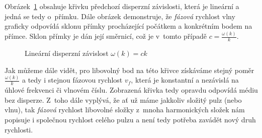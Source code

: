Obrázek~\ref{fig:lin_disp_rel} obsahuje křivku
předchozí disperzní závislosti, která je lineární
a jedná se tedy o~přímku. Dále obrázek demonstruje,
že \textit{fázová} rychlost vlny graficky odpovídá
sklonu přímky procházející počátkem a konkrétním bodem
na přímce. Sklon přímky je dán její směrnicí, což
je v~tomto případě $c = \frac{\omega(k)}{k}$.
\begin{figure}[htbp]
\centering
{}
\caption{Lineární disperzní závislost $\omega(k) = ck$}
\label{fig:lin_disp_rel}
\end{figure}
Jak můžeme dále vidět, pro libovolný bod na této
křivce získáváme stejný poměr $\frac{\omega(k)}{k}$
a tedy i stejnou fázovou rychlost $v_f$, která je
konstantní a nezávislá na úhlové frekvenci či
vlnovém číslu. Zobrazená křivka tedy opravdu odpovídá
médiu bez disperze. Z~toho dále vyplývá, že ať
už máme jakkoliv složitý pulz (nebo vlnu), tak
\textit{fázová} rychlost libovolné
složky z~mnoha harmonických složek nám popisuje i
společnou rychlost celého pulzu a není tedy potřeba
zavádět nový druh rychlosti.

